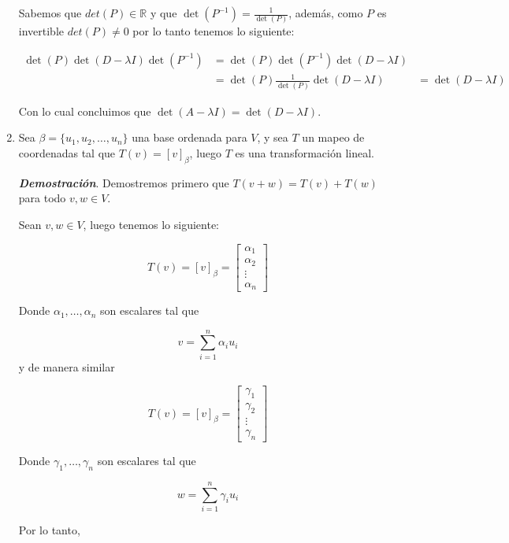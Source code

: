 \documentclass{report}
\begin{document}
\begin{enumerate}
        Sabemos que $det(P) \in \mathbb{R}$ y que $\det(P^{-1}) = \frac{1}{\det(P)}$, además, como $P$ es invertible $det(P) \not = 0$ por lo tanto tenemos lo siguiente:

        \begin{align*}
            \det(P) \det(D-\lambda I) \det(P^{-1}) &= \det(P) \det(P^{-1}) \det(D-\lambda I)\\
            &= \det(P) \frac{1}{\det(P)} \det(D-\lambda I)
            &= \det(D-\lambda I)
        \end{align*}

        Con lo cual concluimos que $\det(A - \lambda I) = \det(D-\lambda I)$.

        \item Sea $\beta = \{u_1, u_2, \dots , u_n\}$ una base ordenada para $V$, y sea $T$ un mapeo de coordenadas tal que $T(v) = [v]_\beta$, luego $T$ es una transformación lineal.
    
        \textit{\textbf{Demostración}}. Demostremos primero que $T(v + w) = T(v) + T(w)$ para todo $v, w \in V$.

        Sean $v, w \in V$, luego tenemos lo siguiente:

        $$T(v) = [v]_\beta = \begin{bmatrix}
            \alpha_1\\ \alpha_2\\ \vdots \\ \alpha_n
        \end{bmatrix}$$

        Donde $\alpha_1,\dots, \alpha_n$ son escalares tal que

        $$v = \sum_{i=1}^{n} \alpha_i u_i$$
        y de manera similar

        $$T(v) = [v]_\beta = \begin{bmatrix}
            \gamma_1\\ \gamma_2\\ \vdots \\ \gamma_n
        \end{bmatrix}$$

        Donde $\gamma_1,\dots, \gamma_n$ son escalares tal que

        $$w = \sum_{i=1}^{n} \gamma_i u_i$$

        Por lo tanto,


\end{enumerate}
\end{document}
